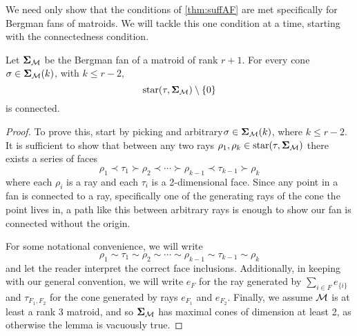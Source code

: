 \documentclass[12pt,oneside]{../../sfsuthesis}
\begin{document}
We need only show that the conditions of \th\ref{thm:suffAF} are met specifically for Bergman fans of matroids.
We will tackle this one condition at a time, starting with the connectedness condition.

\begin{lemma}[Connectedness]\th\label{thm:matroidConnected}
    Let \( {\bm{\Sigma}}_{\mathcal{M}} \) be the Bergman fan of a matroid of rank \( r + 1 \).
    For every cone \( \sigma \in {\bm{\Sigma}}_{\mathcal{M}}(k) \), with \( k \leq r - 2 \),
    \[
        \operatorname{star}(\tau, {\bm{\Sigma}}_{\mathcal{M}}) \setminus \{ 0 \}
    \]
    is connected.
\end{lemma}
\begin{proof}
    To prove this, start by picking and arbitrary\( \sigma \in {\bm{\Sigma}}_{\mathcal{M}}(k) \), where \( k \leq r - 2 \).
    It is sufficient to show that between any two rays \( \rho_1, \rho_k \in \operatorname{star}(\tau, {\bm{\Sigma}}_{\mathcal{M}}) \) there exists a series of faces
    \[
        \rho_1 \prec \tau_1 \succ \rho_2 \prec \cdots \succ \rho_{k-1} \prec \tau_{k-1} \succ \rho_k
    \]
    where each \( \rho_i \) is a ray and each \( \tau_i \) is a 2-dimensional face.
    Since any point in a fan is connected to a ray, specifically one of the generating rays of the cone the point lives in, a path like this between arbitrary rays is enough to show our fan is connected without the origin.

    For some notational convenience, we will write
    \[
        \rho_1 \sim \tau_1 \sim \rho_2 \sim \cdots \sim \rho_{k-1} \sim \tau_{k-1} \sim \rho_k
    \]
    and let the reader interpret the correct face inclusions.
    Additionally, in keeping with our general convention, we will write \( e_F \) for the ray generated by \( \sum_{i \in F} e_{\{i\}} \) and \( \tau_{F_1, F_2} \) for the cone generated by rays \( e_{F_1} \) and \( e_{F_2} \).
    Finally, we assume \( \mathcal{M} \) is at least a rank 3 matroid, and so \( {\bm{\Sigma}}_{\mathcal{M}} \) has maximal cones of dimension at least 2, as otherwise the lemma is vacuously true.


\end{proof}
\end{document}

